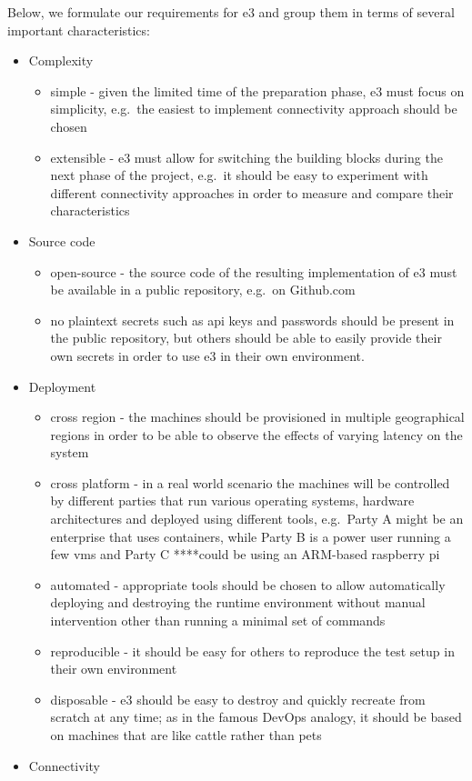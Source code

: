 Below, we formulate our requirements for \gls{e3} and group them in
terms of several important characteristics:

\begin{itemize}
\tightlist
\item
  Complexity

  \begin{itemize}
  \tightlist
  \item
    simple - given the limited time of the preparation phase, \gls{e3}
    must focus on simplicity, e.g.~the easiest to implement connectivity
    approach should be chosen
  \item
    extensible - \gls{e3} must allow for switching the building blocks
    during the next phase of the project, e.g.~it should be easy to
    experiment with different connectivity approaches in order to
    measure and compare their characteristics
  \end{itemize}
\item
  Source code

  \begin{itemize}
  \tightlist
  \item
    open-source - the source code of the resulting implementation of
    \gls{e3} must be available in a public repository, e.g.~on
    Github.com
  \item
    no plaintext secrets such as \gls{api} keys and passwords should be
    present in the public repository, but others should be able to
    easily provide their own secrets in order to use \gls{e3} in their
    own environment.
  \end{itemize}
\item
  Deployment

  \begin{itemize}
  \tightlist
  \item
    cross region - the machines should be provisioned in multiple
    geographical regions in order to be able to observe the effects of
    varying latency on the system
  \item
    cross platform - in a real world scenario the machines will be
    controlled by different parties that run various operating systems,
    hardware architectures and deployed using different tools,
    e.g.~Party A might be an enterprise that uses containers, while
    Party B is a power user running a few \glspl{vm} and Party C
    ****could be using an ARM-based raspberry pi
  \item
    automated - appropriate tools should be chosen to allow
    automatically deploying and destroying the runtime environment
    without manual intervention other than running a minimal set of
    commands
  \item
    reproducible - it should be easy for others to reproduce the test
    setup in their own environment
  \item
    disposable - \gls{e3} should be easy to destroy and quickly recreate
    from scratch at any time; as in the famous DevOps
    analogy\autocite{biasHistoryPetsVs2016}, it should be based on
    machines that are like cattle rather than pets
  \end{itemize}
\item
  Connectivity


\end{itemize}

